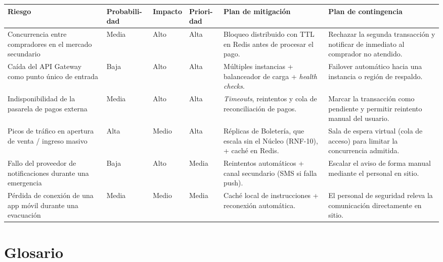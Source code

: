 \documentclass[11pt,a4paper]{article}
\begin{document}
\begin{center}
\begin{longtable}{|p{2.4cm}|p{2cm}|p{1.5cm}|p{1.4cm}|p{2.8cm}|p{2.8cm}|}
\hline
\textbf{Riesgo} & \textbf{Probabili-dad} & \textbf{Impacto} & \textbf{Priori-dad} & \textbf{Plan de
mitigación} & \textbf{Plan de contingencia} \\
\hline
\endhead
Concurrencia entre compradores en el mercado secundario & Media & Alto & Alta & Bloqueo
distribuido con TTL en Redis antes de procesar el pago. & Rechazar la segunda transacción y
notificar de inmediato al comprador no atendido.\\
\hline
Caída del API Gateway como punto único de entrada & Baja & Alto & Alta & Múltiples instancias +
balanceador de carga + \textit{health checks}. & Failover automático hacia una instancia o región
de respaldo.\\
\hline
Indisponibilidad de la pasarela de pagos externa & Media & Alto & Alta & \textit{Timeouts},
reintentos y cola de reconciliación de pagos. & Marcar la transacción como pendiente y permitir
reintento manual del usuario.\\
\hline
Picos de tráfico en apertura de venta / ingreso masivo & Alta & Medio & Alta & Réplicas de
Boletería, que escala sin el Núcleo (RNF-10), + caché en Redis. & Sala de espera virtual (cola de acceso) para limitar la
concurrencia admitida.\\
\hline
Fallo del proveedor de notificaciones durante una emergencia & Baja & Alto & Media & Reintentos
automáticos + canal secundario (SMS si falla push). & Escalar el aviso de forma manual mediante el
personal en sitio.\\
\hline
Pérdida de conexión de una app móvil durante una evacuación & Media & Medio & Media & Caché local
de instrucciones + reconexión automática. & El personal de seguridad releva la comunicación
directamente en sitio.\\
\hline
\end{longtable}
\end{center}

\section{Glosario}
\label{sec:glosario}
\end{document}
